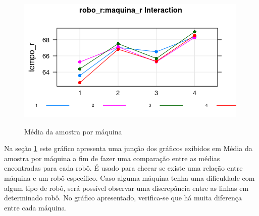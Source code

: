 \documentclass[
12pt,					%
openright,				%
oneside,				%
a4paper,				%
english,
brazil
]{ABNT/abntex2_report}
\begin{document}
\begin{figure}[H]
	\centering
	\caption{Média da amostra por máquina}
	\includegraphics[scale = 1]{figures/graf6.png}
	\label{fig:graf6}
\end{figure}

Na seção \ref{fig:graf6} este gráfico apresenta uma junção dos gráficos exibidos em Média da amostra por máquina a fim de fazer uma comparação entre as médias encontradas para cada robô. É usado para checar se existe uma relação entre máquina e um robô específico. Caso alguma máquina tenha uma dificuldade com algum tipo de robô, será possível observar uma discrepância entre as linhas em determinado robô. No gráfico apresentado, verifica-se que há muita diferença entre cada máquina.

	\cleardoublepage
	\titleformat{\chapter}[display]{\vspace*{-24pt}\ABNTEXchapterfont\large\bfseries}{\chaptertitlename\ \thechapter}{12pt}{\Large}
	
\end{document}
